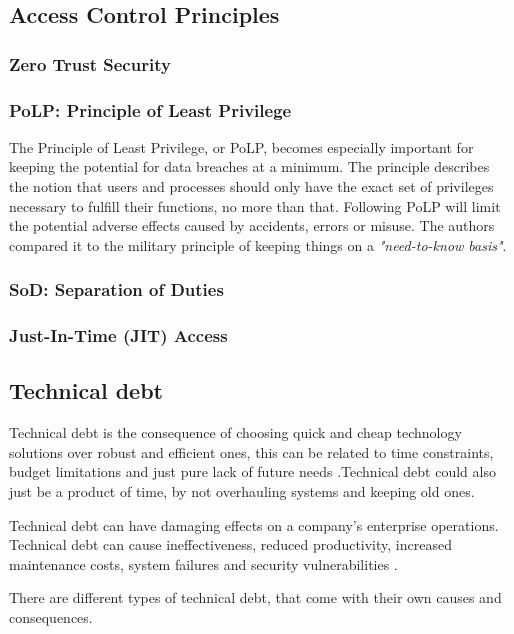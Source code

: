 \subsection{Access Control Principles}
\subsubsection{Zero Trust Security}
\subsubsection{PoLP: Principle of Least Privilege}
The Principle of Least Privilege, or PoLP, becomes especially important for keeping the potential for data breaches at a minimum. The principle describes the notion that users and processes should only have the exact set of privileges necessary to fulfill their functions, no more than that\citep{OGDef-PoLP}. Following PoLP will limit the potential adverse effects caused by accidents, errors or misuse. The authors compared it to the military principle of keeping things on a \textit{"need-to-know basis"}\citep{OGDef-PoLP}. 

\subsubsection{SoD: Separation of Duties}
\subsubsection{Just-In-Time (JIT) Access}

\subsection{Technical debt}
Technical debt is the consequence of choosing quick and cheap technology solutions over robust and efficient ones, this can be related to time constraints, budget limitations and just pure lack of future needs \citep{TechinicalDebtOUTsystem}.Technical debt could also just be a product of time, by not overhauling systems and keeping old ones. 

Technical debt can have damaging effects on a company's enterprise operations. Technical debt can cause ineffectiveness, reduced productivity, increased maintenance costs, system failures and security vulnerabilities \citep{TechinicalDebtOUTsystem}.

There are different types of technical debt, that come with their own causes and consequences. 


